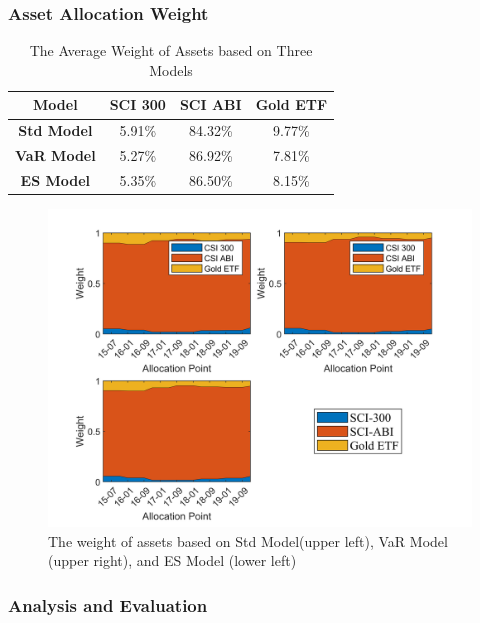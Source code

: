 \subsubsection{Asset Allocation Weight}
\begin{table}[H]
    \centering
    \begin{tabular}{|c|c|c|c|}
    \hline
    {\bf Model} & {\bf SCI 300} & {\bf SCI ABI} & {\bf Gold ETF} \\
    \hline
    {\bf Std Model} &     5.91\% &    84.32\% &     9.77\% \\
    \hline
    {\bf VaR Model} &     5.27\% &    86.92\% &     7.81\% \\
    \hline
    {\bf ES Model} &     5.35\% &    86.50\% &     8.15\% \\
    \hline
    \end{tabular}  
    \caption{The Average Weight of Assets based on Three Models}
    \label{Tab4}
\end{table}
\begin{figure}[H]
    \centering
    \includegraphics[scale=0.9]{Figure/FIG5-Allocation_Weight.png}
    \caption{The weight of assets based on Std Model(upper left), VaR Model (upper right), and ES Model (lower left)}
    \label{Fig5}
\end{figure}

\subsubsection{Analysis and Evaluation}
